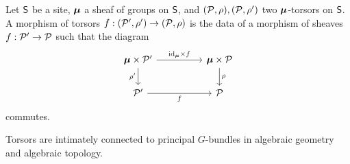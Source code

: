 \begin{definition}\label{def: morphism of torosrs}
    Let $\mathsf{S}$ be a site, $\bm{\mu}$ a sheaf of groups on $\mathsf{S}$, and $(\mathcal{P},\rho),(\mathcal{P},\rho')$ two $\bm{\mu}$-torsors on $\mathsf{S}$. A morphism of torsors $f:(\mathcal{P}',\rho')\to(\mathcal{P},\rho)$ is the data of a morphism of sheaves $f:\mathcal{P}'\to\mathcal{P}$ such that the diagram 
    $$%
    \begin{tikzcd}
        {\Bmu\times\Pcal'} && \Bmu\times\Pcal \\
        {\Pcal'} && \Pcal
        \arrow["f"', from=2-1, to=2-3]
        \arrow["{\id_{\Bmu}\times f}", from=1-1, to=1-3]
        \arrow["{\rho'}"', from=1-1, to=2-1]
        \arrow["\rho", from=1-3, to=2-3]
    \end{tikzcd}$$
    commutes. 
\end{definition}
Torsors are intimately connected to principal $G$-bundles in algebraic geometry and algebraic topology. 
